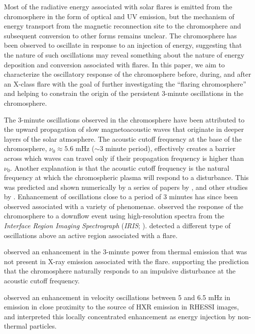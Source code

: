 Most of the radiative energy associated with solar flares
is emitted from the chromosphere
in the form of optical and UV emission, but the mechanism of energy
transport from the magnetic reconnection site to the chromosphere
and subsequent conversion to other forms remains unclear.
The chromosphere has been observed
to oscillate in response to an injection of energy,
suggesting that the nature of such oscillations may reveal
something about the nature of energy deposition and conversion
associated with flares.
In this paper, we aim to characterize the oscillatory response of
the chromosphere before, during, and after an X-class flare
with the goal of
further investigating the ``flaring chromosphere'' and
helping to constrain the origin of the persistent 3-minute oscillations
in the chromosphere.

%
The 3-minute oscillations observed in the chromosphere
have been attributed to the upward propagation of slow
magnetoacoustic waves that originate in deeper layers
of the solar atmosphere.
The acoustic cutoff frequency at the base of the chromosphere,
$\nu_{0} \approx 5.6$ mHz ($\sim$3 minute period),
effectively creates a barrier across which waves can travel
only if their propagation frequency is higher than $\nu_{0}$.
Another explanation is that the acoustic cutoff frequency
is the natural frequency at which the chromospheric plasma will
respond to a disturbance.
This was predicted and shown numerically by
a series of papers by \cite{Sutmann1995a,Sutmann1995b,Sutmann1998},
and other studies by \cite{Chae2015}.
Enhancement of oscillations close to a period of 3 minutes
has since been observed associated with a variety of phenomenae.
\cite{Kwak2016} observed
the response of the chromosphere to a downflow event
using high-resolution spectra from the
\textit{Interface Region Imaging Spectrograph}
(\textit{IRIS}; \cite{DePontieu2014}).
\cite{Kosovichev2007} detected a different type of oscillations above
an active region associated with a flare.

\cite{Milligan2017}
observed an enhancement in the 3-minute power from thermal emission
that was not present in X-ray emission associated with the flare.
supporting the prediction that the chromosphere naturally responds
to an impulsive disturbance at the acoustic cutoff frequency.

\cite{Kumar2006}
observed an enhancement in velocity oscillations between 5 and 6.5 mHz
in emission in close proximity to the source of HXR emission
in RHESSI images,
and interpreted this locally concentrated enhancement as energy injection by
non-thermal particles.


